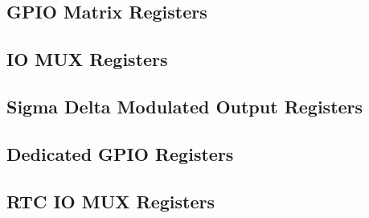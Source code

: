 \documentclass[main\_\_EN.tex]{subfiles}
\begin{document}
\subsection{GPIO Matrix Registers}


\subsection{IO MUX Registers}


\subsection{Sigma Delta Modulated Output Registers}


\subsection{Dedicated GPIO Registers}


\subsection{RTC IO MUX Registers}

\end{document}
